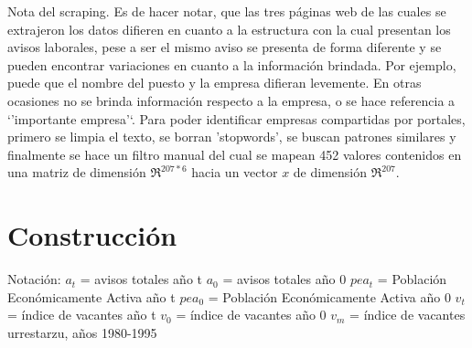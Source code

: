 \documentclass[msc,oneside,a4paper]{udelar} %
\begin{document}
  Nota del scraping. Es de hacer notar, que las tres páginas web de las cuales se extrajeron los datos difieren en cuanto a la estructura con la cual presentan los avisos laborales, pese a ser el mismo aviso se presenta de forma diferente y se pueden encontrar variaciones en cuanto a la información brindada. Por ejemplo, puede que el nombre del puesto y la empresa difieran levemente. En otras ocasiones no se brinda información respecto a la empresa, o se hace referencia a `'importante empresa'`. Para poder identificar empresas compartidas por portales, primero se limpia el texto, se borran 'stopwords', se buscan patrones similares y finalmente se hace un filtro manual del cual se mapean 452 valores contenidos en una matriz de dimensión \(\Re^{207*6}\) hacia un vector \(x\) de dimensión \(\Re^{207}\).
  
  \section{Construcción}
  
  Notación: \newline
  \(a_t\) = avisos totales año t \newline
  \(a_0\) = avisos totales año 0 \newline
  \(pea_t\) = Población Económicamente Activa año t \newline
  \(pea_0\) = Población Económicamente Activa año 0 \newline
  \(v_t\) = índice de vacantes año t \newline
  \(v_0\) = índice de vacantes año 0 \newline
  \(v_m\) = índice de vacantes urrestarzu, años 1980-1995 \newline
  
\end{document}

